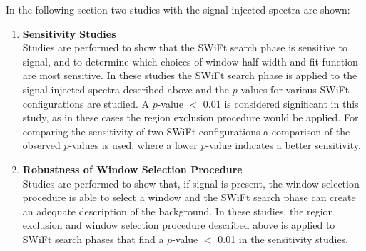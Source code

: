 \noindent
In the following section two studies with the signal injected spectra are shown:
\vspace{-0.5em}
\begin{enumerate}[leftmargin=*]
  \item\textbf{Sensitivity Studies}\\
  Studies are performed to show that the SWiFt search phase is sensitive to signal,
  and to determine which choices of window half-width and fit function are most sensitive.
  In these studies the SWiFt search phase is applied to the signal injected spectra described above and
  the \bh{} \mbox{$p$-value}s for various SWiFt configurations are studied.
  A \mbox{$p$-value} $<$ 0.01 is considered significant in this study,
  as in these cases the region exclusion procedure would be applied.
  For comparing the sensitivity of two SWiFt configurations a comparison of the
  observed \bh{} \mbox{$p$-value}s is used, where a lower \mbox{$p$-value} indicates a better sensitivity.\vspace{1em}
\item\textbf{Robustness of Window Selection Procedure}\\
    Studies are performed to show that, if signal is present, the window selection procedure is able to select a window and
    the SWiFt search phase can create an adequate description of the background.
    In these studies, the region exclusion and window selection procedure described above is applied
    to SWiFt search phases that find a \bh{} \mbox{$p$-value} $<$ 0.01 in the sensitivity studies.
\end{enumerate}

